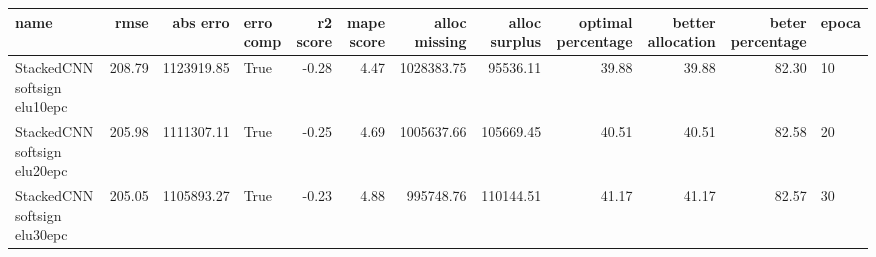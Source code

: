 \begin{tabular}{lrrlrrrrrrrl}
\toprule
name & rmse & abs erro & erro comp & r2 score & mape score & alloc missing & alloc surplus & optimal percentage & better allocation & beter percentage & epoca \\
\midrule
StackedCNN softsign elu10epc & 208.79 & 1123919.85 & True & -0.28 & 4.47 & 1028383.75 & 95536.11 & 39.88 & 39.88 & 82.30 & 10 \\
StackedCNN softsign elu20epc & 205.98 & 1111307.11 & True & -0.25 & 4.69 & 1005637.66 & 105669.45 & 40.51 & 40.51 & 82.58 & 20 \\
StackedCNN softsign elu30epc & 205.05 & 1105893.27 & True & -0.23 & 4.88 & 995748.76 & 110144.51 & 41.17 & 41.17 & 82.57 & 30 \\
\bottomrule
\end{tabular}
